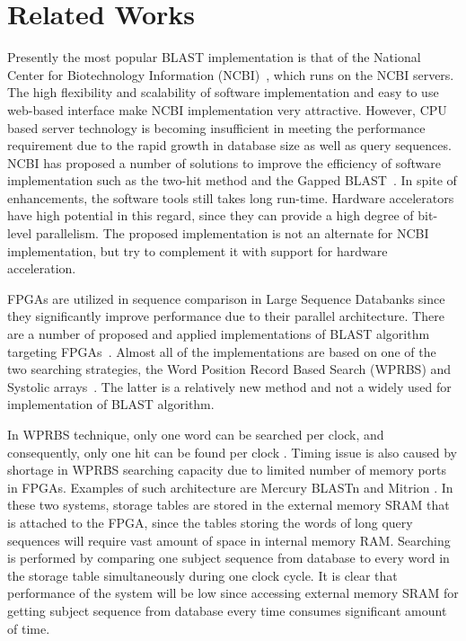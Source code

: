 \section{Related Works}
\label{sec:background}


Presently the most popular BLAST implementation is that of the National Center for Biotechnology Information (NCBI)~\cite{ncbiBlast}, which runs on the NCBI servers.
The high flexibility and scalability of software implementation and easy to use web-based interface make NCBI implementation very attractive.
However, CPU based server technology is becoming insufficient in meeting the performance requirement due to the rapid growth in database size as well as query sequences.
NCBI has proposed a number of solutions to improve the efficiency of software implementation such as the two-hit method and the Gapped BLAST~\cite{WIENBRANDT20111967}.
In spite of enhancements, the software tools still takes long run-time.
Hardware accelerators have high potential in this regard, since they can provide a high degree of bit-level parallelism.
The proposed implementation is not an alternate for NCBI implementation, but try to complement it with support for hardware acceleration.

FPGAs are utilized in sequence comparison in Large Sequence Databanks since they significantly improve performance due to their parallel architecture. 
There are a number of proposed and applied implementations of BLAST algorithm targeting FPGAs~\cite{oliver2005hyper}. 
Almost all of the implementations are based on one of the two searching strategies, the Word Position Record Based Search (WPRBS) and Systolic arrays~\cite{guo2012systolic}. 
The latter is a relatively new method and not a widely used for implementation of BLAST algorithm. 

In WPRBS technique, only one word can be searched per clock, and consequently, only one hit can be found per clock \cite{guo2012open}. 
Timing issue is also caused by shortage in WPRBS searching capacity due to limited number of memory ports in FPGAs. 
Examples of such architecture are Mercury BLASTn \cite{buhler2007mercury} and Mitrion \cite{guo2012systolic}. 
In these two systems, storage tables are stored in the external memory SRAM that is attached to the FPGA, since the tables storing the words of long query sequences will require vast amount of space in internal memory RAM. 
Searching is performed by comparing one subject sequence from database to every word in the storage table simultaneously during one clock cycle. 
It is clear that performance of the system will be low since accessing external memory SRAM for getting subject sequence from database every time consumes significant amount of time. 

